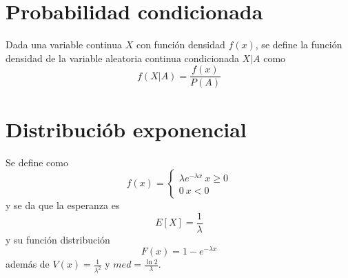 \documentclass{./Probabilidad.tex}
\begin{document}
\section{Probabilidad condicionada}
Dada una variable continua \(X\) con función densidad \(f(x)\), se define la función densidad de la
variable aleatoria continua condicionada \(X | A\) como
\[
	f(X | A) = \frac{f(x)}{P(A)}
\]
\section{Distribuciób exponencial}
Se define como
\[
	f(x) =  \left\{\begin{matrix}
		\lambda e^{-\lambda x}~x \geq 0 \\ 0~ x < 0
		\end{matrix}\right.
\]
y se da que la esperanza es
\[
	E[X] = \frac{1}{\lambda }
\]
y su función distribución
\[
	F(x) = 1 -e^{-\lambda x}
\]
además de \(V(x) = \frac{1}{\lambda^{2}}\) y \(med = \frac{\ln 2}{\lambda }\).
\end{document}
